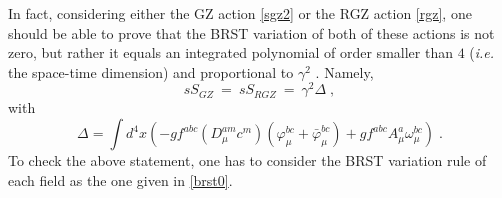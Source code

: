 In fact, considering either the GZ action \eqref{sgz2} or the RGZ action \eqref{rgz}, one
should be able to prove that the BRST variation of both of these actions is not zero, but
rather it equals an integrated polynomial of order smaller than $4$ ({\it i.e.} the space-time
dimension) and proportional to $\gamma^{2}$ \cite{Dudal:2007cw,Dudal:2008sp,Dudal:2011gd,Dudal:2008rm}.
Namely, 
\begin{equation}
s S_{GZ} ~=~ s S_{RGZ} ~=~ \gamma^2 \Delta  \;, \label{brstbrr}
\end{equation}
with
\begin{equation}
\Delta = \int d^{4}x \left( - gf^{abc} (D_\mu^{am}c^m) (\varphi^{bc}_{\mu} + {\bar \varphi}^{bc}_{\mu})   + g f^{abc}A^a_\mu \omega^{bc}_\mu            \right)  \;. \label{brstb1}
\end{equation}
To check the above statement, one has to consider the BRST variation rule of each field as the
one given in \eqref{brst0}.
%
%

